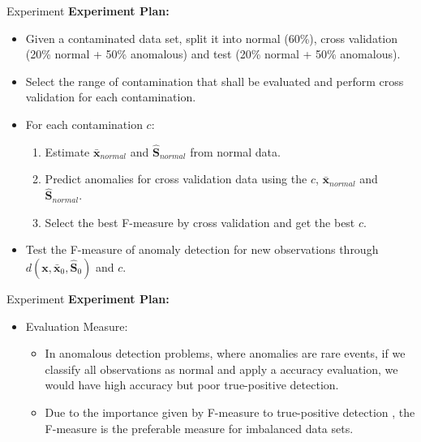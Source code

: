 \documentclass[newPxFont, numfooter, sectionpages]{beamer}
\begin{document}
\begin{frame}[c]{Experiment}
	\textbf{Experiment Plan:}
	\begin{itemize}
		\item Given a contaminated data set, split it into normal (60\%), cross validation (20\% normal + 50\% anomalous) and test (20\% normal + 50\% anomalous).
		\item Select the range of contamination that shall be evaluated and perform cross validation for each contamination. 
		\item For each contamination $c$:
		\begin{enumerate}
			\item Estimate $\boldsymbol{\bar{x}}_{normal}$ and $\boldsymbol{\hat{S}}_{normal}$ from normal data.
			\item Predict anomalies for cross validation data using the $c$, $\boldsymbol{\bar{x}}_{normal}$ and $\boldsymbol{\hat{S}}_{normal}$.
			\item Select the best F-measure by cross validation and get the best $c$.
		\end{enumerate}
		\item Test the F-measure of anomaly detection for new observations through $d(\boldsymbol{x},\bar{\boldsymbol{x}}_0, \boldsymbol{\hat{S}}_0)$ and $c$.
	\end{itemize}
\end{frame}

\begin{frame}[c]{Experiment}
	\textbf{Experiment Plan:}
	\begin{itemize}
	    \item Evaluation Measure:
		\begin{itemize}
			\item In anomalous detection problems, where anomalies are rare events, if we classify all observations as normal and apply a accuracy evaluation, we would have high accuracy but poor true-positive detection.
			\item Due to the importance given by F-measure to true-positive detection \cite{moustafa2019holistic}, the F-measure is the preferable measure for imbalanced data sets.
    	\end{itemize}
	\end{itemize}
\end{frame}
\end{document}
